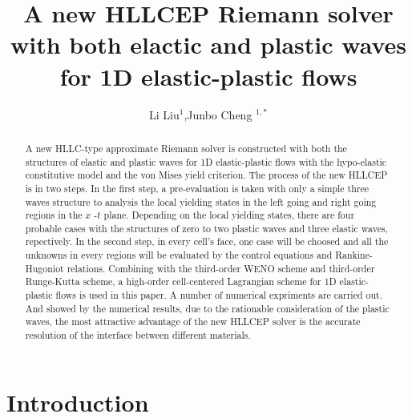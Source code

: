 \documentclass{article}
\numberwithin{equation}{section}
\numberwithin{table}{section}
\begin{document}
\title{A new HLLCEP Riemann solver with both elactic and plastic waves for 1D elastic-plastic flows}
\author{Li Liu$^1$,Junbo Cheng $^{1,*}$}

\maketitle

\address{$^1$  Institute of Applied Physics and Computational Mathematics, Beijing 100094, China }

\begin{abstract}

  A new  HLLC-type  approximate Riemann solver is constructed with both the structures of elastic and plastic waves for 1D elastic-plastic flows with the hypo-elastic constitutive model and the von Mises yield criterion. The process of the new HLLCEP is in two steps. In the first step, a pre-evaluation is taken with only a  simple three waves structure to analysis the local yielding states in the left going  and right going regions in the $x$ -$t$ plane. Depending on the local yielding states, there are four probable cases with the structures of zero to two plastic waves and three elastic waves, repectively. In the second step,  in every cell's face, one case will be  choosed and all the unknowns in every regions will be evaluated by the control equations and Rankine-Hugoniot relations.  Combining with the third-order WENO scheme and third-order Runge-Kutta scheme, a high-order cell-centered Lagrangian scheme for 1D elastic-plastic flows is used in this paper. A number of numerical expriments are carried out.  And showed by the numerical results, due to the rationable  consideration  of the plastic waves, the most attractive advantage of the new HLLCEP solver is the accurate resolution of the interface between different materials.  
\end{abstract}

\section{Introduction}
\end{document}
